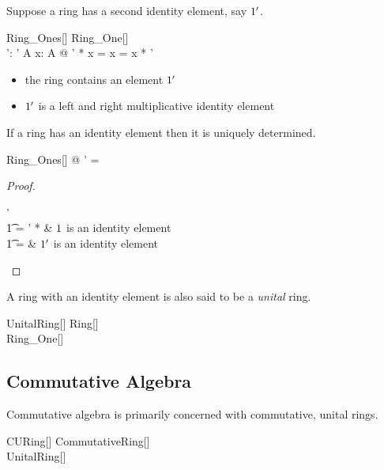 \documentclass{amsart}
\begin{document}
Suppose a ring has a second identity element, say $1'$.

\begin{schema}{Ring\_Ones}[\genT]
	Ring\_One[\genT] \\
	\ringOne': \genT
\where
	\ringOne' \in A
\also
	\forall x: A @ \ringOne' * x = x = x * \ringOne'
\end{schema}

\begin{itemize}
	\item the ring contains an element $1'$
	\item $1'$ is a left and right multiplicative identity element
\end{itemize}

\begin{remark} If a ring has an identity element then it is uniquely determined.
\begin{zed}
	\forall Ring\_Ones[\setT] @ \ringOne' = \ringOne
\end{zed}

\begin{proof}
\begin{argue}
\ringOne' \\
\t1	= \ringOne' * \ringOne	& $1$ is an identity element \\
\t1	= \ringOne						& $1'$ is an identity element
\end{argue}
\end{proof}

\end{remark}

A ring with an identity element is also said to be a \textit{unital} ring.

\begin{schema}{UnitalRing}[\genT]
	Ring[\genT] \\
	Ring\_One[\genT]
\end{schema}

\subsection{Commutative Algebra}

Commutative algebra is primarily concerned with commutative, unital rings.

\begin{schema}{CURing}[\genT]
	CommutativeRing[\genT] \\
	UnitalRing[\genT]
\end{schema}
\end{document}
